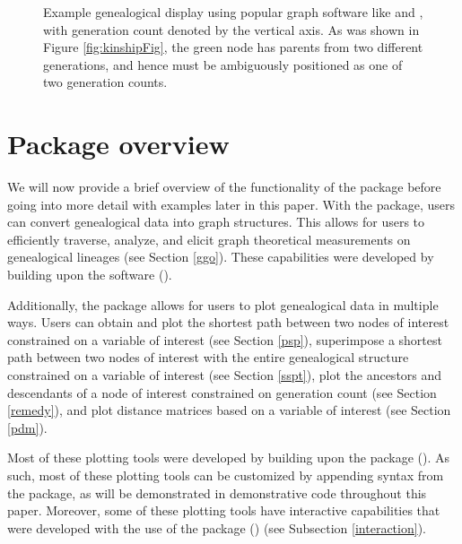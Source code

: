 \documentclass[article,shortnames]{jss}
\begin{document}
\begin{figure}[H]
    \centering
    \caption{Example genealogical display using popular graph software like  and , with generation count denoted by the vertical axis. As was shown in Figure \ref{fig:kinshipFig}, the green node has parents from two different generations, and hence must be ambiguously positioned as one of two generation counts.}
    \label{fig:Graph}
\end{figure}

\section{Package overview}

We will now provide a brief overview of the functionality of the  package before going into more detail with examples later in this paper. With the  package, users can convert genealogical data into graph structures. This allows for users to efficiently traverse, analyze, and elicit graph theoretical measurements on genealogical lineages (see Section \ref{ggo}). These capabilities were developed by building upon the  software (\citealt{igraph}).

Additionally, the  package allows for users to plot genealogical data in multiple ways. Users can obtain and plot the shortest path between two nodes of interest constrained on a variable of interest (see Section \ref{psp}), superimpose a shortest path between two nodes of interest with the entire genealogical structure constrained on a variable of interest (see Section \ref{sspt}), plot the ancestors and descendants of a node of interest constrained on generation count (see Section \ref{remedy}), and plot distance matrices based on a variable of interest (see Section \ref{pdm}).

Most of these plotting tools were developed by building upon the  package (\citealt{ggplot2}). As such, most of these plotting tools can be customized by appending syntax from the  package, as will be demonstrated in demonstrative code throughout this paper. Moreover, some of these plotting tools have interactive capabilities that were developed with the use of the  package (\citealt{plotly}) (see Subsection \ref{interaction}).
\end{document}
